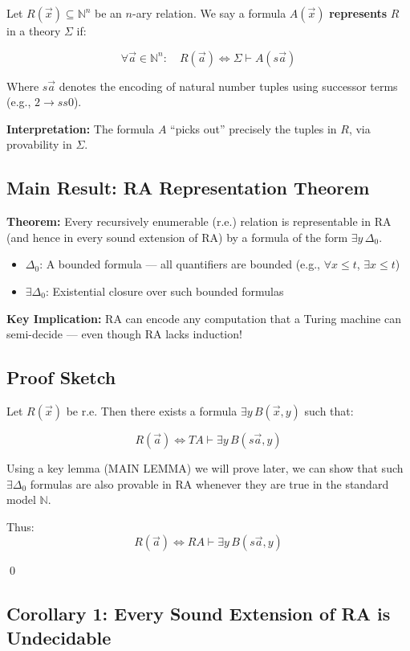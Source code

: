 \documentclass[12pt]{article}
\begin{document}
Let \( R(\vec{x}) \subseteq \mathbb{N}^n \) be an \( n \)-ary relation. We say a formula \( A(\vec{x}) \) \textbf{represents} \( R \) in a theory \( \Sigma \) if:

\[
\forall \vec{a} \in \mathbb{N}^n: \quad R(\vec{a}) \iff \Sigma \vdash A(s\vec{a})
\]

Where \( s\vec{a} \) denotes the encoding of natural number tuples using successor terms (e.g., \( 2 \rightarrow ss0 \)).

\textbf{Interpretation:} The formula \( A \) “picks out” precisely the tuples in \( R \), via provability in \( \Sigma \).

\subsection{Main Result: RA Representation Theorem}

\textbf{Theorem:} Every recursively enumerable (r.e.) relation is representable in RA (and hence in every sound extension of RA) by a formula of the form \( \exists y\, \Delta_0 \).

\begin{itemize}
  \item \( \Delta_0 \): A bounded formula — all quantifiers are bounded (e.g., \( \forall x \leq t \), \( \exists x \leq t \))
  \item \( \exists \Delta_0 \): Existential closure over such bounded formulas
\end{itemize}

\textbf{Key Implication:} RA can encode any computation that a Turing machine can semi-decide — even though RA lacks induction!

\subsection{Proof Sketch}

Let \( R(\vec{x}) \) be r.e. Then there exists a formula \( \exists y\, B(\vec{x}, y) \) such that:

\[
R(\vec{a}) \iff TA \vdash \exists y\, B(s\vec{a}, y)
\]

Using a key lemma (MAIN LEMMA) we will prove later, we can show that such \( \exists \Delta_0 \) formulas are also provable in RA whenever they are true in the standard model \( \mathbb{N} \).

Thus:
\[
R(\vec{a}) \iff RA \vdash \exists y\, B(s\vec{a}, y)
\]

\qed

\subsection{Corollary 1: Every Sound Extension of RA is Undecidable}
\end{document}
